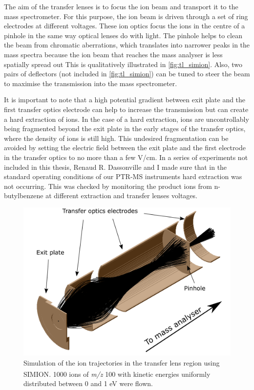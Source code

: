 The aim of the transfer lenses is to focus the ion beam and transport it to the mass spectrometer. For this purpose, the ion beam is driven through a set of ring electrodes at different voltages. These ion optics focus the ions in the centre of a pinhole in the same way optical lenses do with light. The pinhole helps to clean the beam from chromatic aberrations, which translates into narrower peaks in the mass spectra because the ion beam that reaches the mass analyser is less spatially spread out
This is qualitatively illustrated in \autoref{fig:tl_simion}.
Also, two pairs of deflectors (not included in \autoref{fig:tl_simion}) can be tuned to steer the beam to maximise the transmission into the mass spectrometer.

It is important to note that a high potential gradient between exit plate and the first transfer optics electrode can help to increase the transmission but can create a hard extraction of ions. In the case of a hard extraction, ions are uncontrollably being fragmented beyond the exit plate in the early stages of the transfer optics, where the density of ions is still high. This undesired fragmentation can be avoided by setting  the electric field between the exit plate and the first electrode in the transfer optics to no more than a few V/cm. In a series of experiments not included in this thesis, Renaud R. Dassonville and I made sure that in the standard operating conditions of our PTR-MS instruments hard extraction was not occurring. This was checked by monitoring the product ions from n-butylbenzene at different extraction and transfer lenses voltages.

\begin{figure}%
\centering
\includegraphics[width=0.6\linewidth]{pics/tf_names.png}
\centering
\caption[Simulation of the ion trajectories in the transfer lens region using SIMION\textsuperscript{\textregistered}.]{Simulation of the ion trajectories in the transfer lens region using SIMION\textsuperscript{\textregistered}. 1000 ions of \textit{m/z} 100 with kinetic energies uniformly distributed between 0 and 1 eV were flown.}
\label{fig:tl_simion}
\end{figure}


